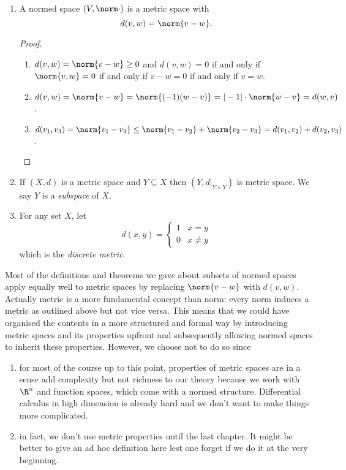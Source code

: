 \documentclass[a4paper]{article}
\theoremstyle{definition}
\begin{document}
\begin{eg}\leavevmode
  \begin{enumerate}
  \item A normed space \((V, \norm \cdot)\) is a metric space with
    \[
      d(v, w) = \norm{v - w}.
    \]

    \begin{proof}\leavevmode
      \begin{enumerate}
      \item \(d(v, w) = \norm{v - w} \geq 0\) and \(d(v, w) = 0\) if and only if \(\norm{v, w} = 0\) if and only if \(v - w = 0\) if and only if \(v = w\).
      \item \(d(v, w) = \norm{v - w} = \norm{(-1)(w - v)} = |-1| \cdot \norm{w - v} = d(w, v)\).
      \item \(d(v_1, v_3) = \norm{v_1 - v_3} \leq \norm{v_1 - v_2} + \norm{v_2 - v_3} = d(v_1, v_2) + d(v_2, v_3)\).
      \end{enumerate}
    \end{proof}
  \item If \((X, d)\) is a metric space and \(Y \subseteq X\) then \((Y, d|_{Y \times Y})\) is metric space. We say \(Y\) is a \emph{subspace} of \(X\).
  \item For any set \(X\), let
    \[
      d(x, y) =
      \begin{cases}
        1 & x = y \\
        0 & x \neq y
      \end{cases}
    \]
    which is the \emph{discrete metric}.
  \end{enumerate}
\end{eg}

Most of the definitions and theorems we gave about subsets of normed spaces apply equally well to metric spaces by replacing \(\norm{v - w}\) with \(d(v, w)\). Actually metric is a more fundamental concept than norm: every norm induces a metric as outlined above but not vice versa. This means that we could have organised the contents in a more structured and formal way by introducing metric spaces and its properties upfront and subsequently allowing normed spaces to inherit these properties. However, we choose not to do so since

\begin{enumerate}
\item for most of the course up to this point, properties of metric spaces are in a sense add complexity but not richness to our theory because we work with \(\R^n\) and function spaces, which come with a normed structure. Differential calculus in high dimension is already hard and we don't want to make things more complicated.
\item in fact, we don't use metric properties until the last chapter. It might be better to give an ad hoc definition here lest one forget if we do it at the very beginning.
\end{enumerate}
\end{document}
